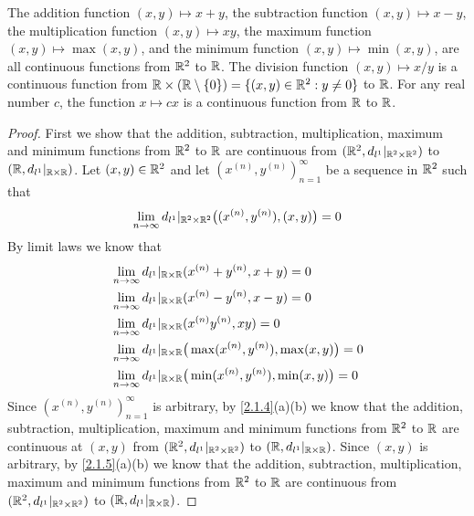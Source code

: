 \begin{lem}\label{2.2.2}
  The addition function \((x, y) \mapsto x + y\), the subtraction function \((x, y) \mapsto x - y\), the multiplication function \((x, y) \mapsto xy\), the maximum function \((x, y) \mapsto \max(x, y)\), and the minimum function \((x, y) \mapsto \min(x, y)\), are all continuous functions from \(\mathbb{R}^2\) to \(\mathbb{R}\).
  The division function \((x, y) \mapsto x / y\) is a continuous function from \(\mathbb{R} \times (\mathbb{R} \setminus \{0\}) = \{(x, y) \in \mathbb{R}^2 : y \neq 0\}\) to \(\mathbb{R}\).
  For any real number \(c\), the function \(x \mapsto cx\) is a continuous function from \(\mathbb{R}\) to \(\mathbb{R}\).
\end{lem}

\begin{proof}
  First we show that the addition, subtraction, multiplication, maximum and minimum functions from \(\mathbb{R}^2\) to \(\mathbb{R}\) are continuous from \((\mathbb{R}^2, d_{l^1}|_{\mathbb{R}^2 \times \mathbb{R}^2})\) to \((\mathbb{R}, d_{l^1}|_{\mathbb{R} \times \mathbb{R}})\).
  Let \((x, y) \in \mathbb{R}^2\) and let \((x^{(n)}, y^{(n)})_{n = 1}^\infty\) be a sequence in \(\mathbb{R}^2\) such that
  \[
    \lim_{n \to \infty} d_{l^1}|_{\mathbb{R}^2 \times \mathbb{R}^2}\big((x^{(n)}, y^{(n)}), (x, y)\big) = 0
  \]
  By limit laws we know that
  \begin{align*}
     & \lim_{n \to \infty} d_{l^1}|_{\mathbb{R} \times \mathbb{R}}(x^{(n)} + y^{(n)}, x + y) = 0                   \\
     & \lim_{n \to \infty} d_{l^1}|_{\mathbb{R} \times \mathbb{R}}(x^{(n)} - y^{(n)}, x - y) = 0                   \\
     & \lim_{n \to \infty} d_{l^1}|_{\mathbb{R} \times \mathbb{R}}(x^{(n)} y^{(n)}, xy) = 0                        \\
     & \lim_{n \to \infty} d_{l^1}|_{\mathbb{R} \times \mathbb{R}}\big(\max(x^{(n)}, y^{(n)}), \max(x, y)\big) = 0 \\
     & \lim_{n \to \infty} d_{l^1}|_{\mathbb{R} \times \mathbb{R}}\big(\min(x^{(n)}, y^{(n)}), \min(x, y)\big) = 0 \\
  \end{align*}
  Since \((x^{(n)}, y^{(n)})_{n = 1}^\infty\) is arbitrary, by \cref{2.1.4}(a)(b) we know that the addition, subtraction, multiplication, maximum and minimum functions from \(\mathbb{R}^2\) to \(\mathbb{R}\) are continuous at \((x, y)\) from \((\mathbb{R}^2, d_{l^1}|_{\mathbb{R}^2 \times \mathbb{R}^2})\) to \((\mathbb{R}, d_{l^1}|_{\mathbb{R} \times \mathbb{R}})\).
  Since \((x, y)\) is arbitrary, by \cref{2.1.5}(a)(b) we know that the addition, subtraction, multiplication, maximum and minimum functions from \(\mathbb{R}^2\) to \(\mathbb{R}\) are continuous from \((\mathbb{R}^2, d_{l^1}|_{\mathbb{R}^2 \times \mathbb{R}^2})\) to \((\mathbb{R}, d_{l^1}|_{\mathbb{R} \times \mathbb{R}})\).


\end{proof}
